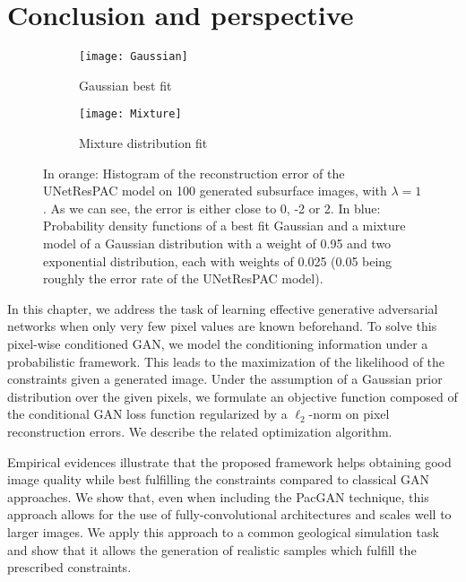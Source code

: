 \section{Conclusion and perspective}

\begin{figure}[!t]
	
	\begin{subfigure}[t]{0.5\textwidth}
		\centering
		\texttt{[image: Gaussian]}
		\caption{Gaussian best fit}
		\label{fig:rec_error}
	\end{subfigure}\begin{subfigure}[t]{0.5\textwidth}
		\centering
		\texttt{[image: Mixture]}
		\caption{Mixture distribution fit}
		\label{fig:mixture_dist}
	\end{subfigure}	
	\caption[Better modeling of the reconstruction error on the Subsurface dataset]{In orange: Histogram of the reconstruction error of the UNetResPAC model on 100 generated subsurface images, with $\lambda = 1$. As we can see, the error is either close to 0, -2 or 2. In blue: Probability density functions of a best fit Gaussian and a mixture model of a Gaussian distribution with a weight of 0.95 and two exponential distribution, each with weights of 0.025 (0.05 being roughly the error rate of the UNetResPAC model).}
\end{figure}

In this chapter, we address the task of learning effective generative adversarial networks when only very few pixel values are known beforehand. To solve this pixel-wise conditioned GAN, we model the conditioning information under a probabilistic framework. This leads to the maximization of the likelihood of the constraints given a
generated image. Under the assumption of a Gaussian prior distribution over the given pixels, we formulate an objective function composed of the conditional GAN loss function regularized by a $\ell_2$-norm on pixel reconstruction errors. We describe the related optimization algorithm.

Empirical evidences illustrate that the proposed framework helps obtaining good image quality while best fulfilling the constraints compared to classical GAN approaches. We show that, even when including the PacGAN technique,  this approach  allows for the use of fully-convolutional architectures and scales well to larger images. We apply this approach to a common geological simulation task and show that it allows the generation of realistic samples which fulfill the prescribed constraints.


